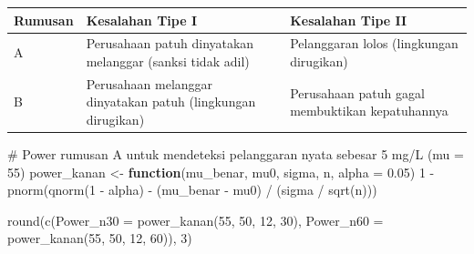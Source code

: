 \documentclass[
  indonesian,
  letterpaper,
]{book}
\newenvironment{Shaded}{\begin{snugshade}}{\end{snugshade}}
\newcommand{\AttributeTok}[1]{\textcolor[rgb]{0.40,0.45,0.13}{#1}}
\newcommand{\CommentTok}[1]{\textcolor[rgb]{0.37,0.37,0.37}{#1}}
\newcommand{\ControlFlowTok}[1]{\textcolor[rgb]{0.00,0.23,0.31}{\textbf{#1}}}
\newcommand{\DecValTok}[1]{\textcolor[rgb]{0.68,0.00,0.00}{#1}}
\newcommand{\FloatTok}[1]{\textcolor[rgb]{0.68,0.00,0.00}{#1}}
\newcommand{\FunctionTok}[1]{\textcolor[rgb]{0.28,0.35,0.67}{#1}}
\newcommand{\NormalTok}[1]{\textcolor[rgb]{0.00,0.23,0.31}{#1}}
\newcommand{\OtherTok}[1]{\textcolor[rgb]{0.00,0.23,0.31}{#1}}
\newcommand{\SpecialCharTok}[1]{\textcolor[rgb]{0.37,0.37,0.37}{#1}}
\newcounter{none} %
\begin{document}
{\def\LTcaptype{none} %
\begin{longtable}[]{@{}
  >{\raggedright\arraybackslash}p{}
  >{\raggedright\arraybackslash}p{}
  >{\raggedright\arraybackslash}p{}@{}}
\toprule\noalign{}
\begin{minipage}[b]{\linewidth}\raggedright
Rumusan
\end{minipage} & \begin{minipage}[b]{\linewidth}\raggedright
Kesalahan Tipe I
\end{minipage} & \begin{minipage}[b]{\linewidth}\raggedright
Kesalahan Tipe II
\end{minipage} \\
\midrule\noalign{}
\endhead
\bottomrule\noalign{}
\endlastfoot
A & Perusahaan patuh dinyatakan melanggar (sanksi tidak adil) &
Pelanggaran lolos (lingkungan dirugikan) \\
B & Perusahaan melanggar dinyatakan patuh (lingkungan dirugikan) &
Perusahaan patuh gagal membuktikan kepatuhannya \\
\end{longtable}
}

\begin{Shaded}
\begin{Highlighting}[]
\CommentTok{\# Power rumusan A untuk mendeteksi pelanggaran nyata sebesar 5 mg/L (mu = 55)}
\NormalTok{power\_kanan }\OtherTok{\textless{}{-}} \ControlFlowTok{function}\NormalTok{(mu\_benar, mu0, sigma, n, }\AttributeTok{alpha =} \FloatTok{0.05}\NormalTok{)}
  \DecValTok{1} \SpecialCharTok{{-}} \FunctionTok{pnorm}\NormalTok{(}\FunctionTok{qnorm}\NormalTok{(}\DecValTok{1} \SpecialCharTok{{-}}\NormalTok{ alpha) }\SpecialCharTok{{-}}\NormalTok{ (mu\_benar }\SpecialCharTok{{-}}\NormalTok{ mu0) }\SpecialCharTok{/}\NormalTok{ (sigma }\SpecialCharTok{/} \FunctionTok{sqrt}\NormalTok{(n)))}

\FunctionTok{round}\NormalTok{(}\FunctionTok{c}\NormalTok{(}\AttributeTok{Power\_n30 =} \FunctionTok{power\_kanan}\NormalTok{(}\DecValTok{55}\NormalTok{, }\DecValTok{50}\NormalTok{, }\DecValTok{12}\NormalTok{, }\DecValTok{30}\NormalTok{),}
        \AttributeTok{Power\_n60 =} \FunctionTok{power\_kanan}\NormalTok{(}\DecValTok{55}\NormalTok{, }\DecValTok{50}\NormalTok{, }\DecValTok{12}\NormalTok{, }\DecValTok{60}\NormalTok{)), }\DecValTok{3}\NormalTok{)}
\end{Highlighting}
\end{Shaded}
\end{document}
